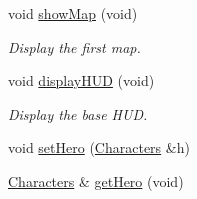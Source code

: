 \begin{DoxyCompactItemize}
void \hyperlink{class_game_ab1ab415f40c6a952da0f93a7bf3ffee1}{show\-Map} (void)
\begin{DoxyCompactList}\small\item\em Display the first map. \end{DoxyCompactList}\item 
void \hyperlink{class_game_a194dbc017575c98bda4e2317d266a67e}{display\-H\-U\-D} (void)
\begin{DoxyCompactList}\small\item\em Display the base H\-U\-D. \end{DoxyCompactList}\item 
void \hyperlink{class_game_a730c7eeaa90f5ceab71abce303bfd367}{set\-Hero} (\hyperlink{class_characters}{Characters} \&h)
\item 
\hyperlink{class_characters}{Characters} \& \hyperlink{class_game_a7f62e55c834c5ee4b626acb58f5bbd28}{get\-Hero} (void)
\end{DoxyCompactItemize}

